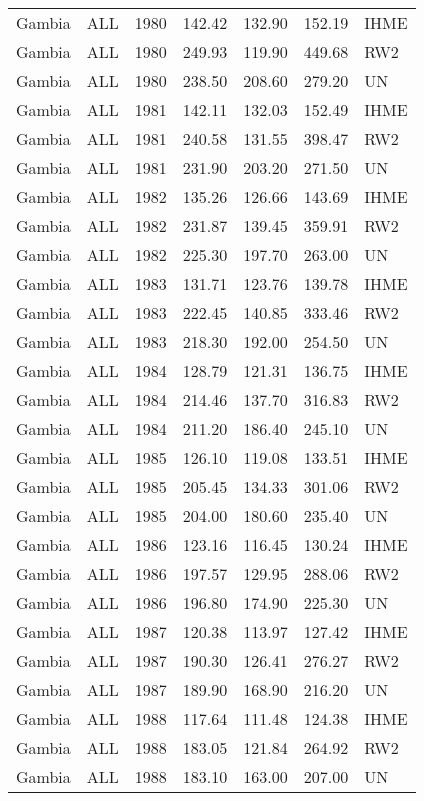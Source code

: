 \begin{longtable}{lllrrrl}
  Gambia & ALL & 1980 & 142.42 & 132.90 & 152.19 & IHME \\ 
  Gambia & ALL & 1980 & 249.93 & 119.90 & 449.68 & RW2 \\ 
  Gambia & ALL & 1980 & 238.50 & 208.60 & 279.20 & UN \\ 
  Gambia & ALL & 1981 & 142.11 & 132.03 & 152.49 & IHME \\ 
  Gambia & ALL & 1981 & 240.58 & 131.55 & 398.47 & RW2 \\ 
  Gambia & ALL & 1981 & 231.90 & 203.20 & 271.50 & UN \\ 
  Gambia & ALL & 1982 & 135.26 & 126.66 & 143.69 & IHME \\ 
  Gambia & ALL & 1982 & 231.87 & 139.45 & 359.91 & RW2 \\ 
  Gambia & ALL & 1982 & 225.30 & 197.70 & 263.00 & UN \\ 
  Gambia & ALL & 1983 & 131.71 & 123.76 & 139.78 & IHME \\ 
  Gambia & ALL & 1983 & 222.45 & 140.85 & 333.46 & RW2 \\ 
  Gambia & ALL & 1983 & 218.30 & 192.00 & 254.50 & UN \\ 
  Gambia & ALL & 1984 & 128.79 & 121.31 & 136.75 & IHME \\ 
  Gambia & ALL & 1984 & 214.46 & 137.70 & 316.83 & RW2 \\ 
  Gambia & ALL & 1984 & 211.20 & 186.40 & 245.10 & UN \\ 
  Gambia & ALL & 1985 & 126.10 & 119.08 & 133.51 & IHME \\ 
  Gambia & ALL & 1985 & 205.45 & 134.33 & 301.06 & RW2 \\ 
  Gambia & ALL & 1985 & 204.00 & 180.60 & 235.40 & UN \\ 
  Gambia & ALL & 1986 & 123.16 & 116.45 & 130.24 & IHME \\ 
  Gambia & ALL & 1986 & 197.57 & 129.95 & 288.06 & RW2 \\ 
  Gambia & ALL & 1986 & 196.80 & 174.90 & 225.30 & UN \\ 
  Gambia & ALL & 1987 & 120.38 & 113.97 & 127.42 & IHME \\ 
  Gambia & ALL & 1987 & 190.30 & 126.41 & 276.27 & RW2 \\ 
  Gambia & ALL & 1987 & 189.90 & 168.90 & 216.20 & UN \\ 
  Gambia & ALL & 1988 & 117.64 & 111.48 & 124.38 & IHME \\ 
  Gambia & ALL & 1988 & 183.05 & 121.84 & 264.92 & RW2 \\ 
  Gambia & ALL & 1988 & 183.10 & 163.00 & 207.00 & UN \\ 

\end{longtable}
